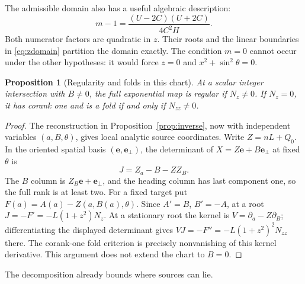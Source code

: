 \documentclass[11pt,a4paper]{article}
\newtheorem{proposition}[theorem]{Proposition}
\theoremstyle{remark}\newtheorem{remark}[theorem]{Remark}
\newcommand{\ee}{\mathbf e}
\newcommand{\ep}{\mathbf e_{\perp}}
\begin{document}
The admissible domain also has a useful algebraic description:
\begin{equation}\label{eq:factor}
 m-1=\frac{(U-2C)(U+2C)}{4C^2H}.
\end{equation}
Both numerator factors are quadratic in $z$. Their roots and the linear
boundaries in \eqref{eq:zdomain} partition the domain exactly. The
condition $m=0$ cannot occur under the other hypotheses: it would force
$z=0$ and $x^2+\sin^2\theta=0$.

\begin{proposition}[Regularity and folds in this chart]\label{prop:fold}
At a scalar integer intersection with $B\ne0$, the full exponential map
is regular if $N_z\ne0$. If $N_z=0$, it has corank one and is a fold
if and only if $N_{zz}\ne0$.
\end{proposition}
\begin{proof}
The reconstruction in Proposition~\ref{prop:inverse}, now with
independent variables $(a,B,\theta)$, gives local analytic source
coordinates. Write $Z=nL+Q_0$. In the oriented spatial basis
$(\ee,\ep)$, the determinant of
$X=Z\ee+B\ep$ at fixed $\theta$ is
\[
 J=Z_a-B-ZZ_B.
\]
The $B$ column is $Z_B\ee+\ep$, and the heading column has last
component one, so the full rank is at least two.
For a fixed target put $F(a)=A(a)-Z(a,B(a),\theta)$.
Since $A'=B$, $B'=-A$, at a root
$J=-F'=-L(1+z^2)N_z$.
At a stationary root the kernel is
$V=\partial_a-Z\partial_B$; differentiating the displayed determinant
gives $VJ=-F''=-L(1+z^2)^2N_{zz}$ there.
The corank-one fold criterion is precisely nonvanishing of this kernel
derivative. This argument does not extend the chart to $B=0$.
\end{proof}

The decomposition already bounds where sources can lie.
\end{document}
